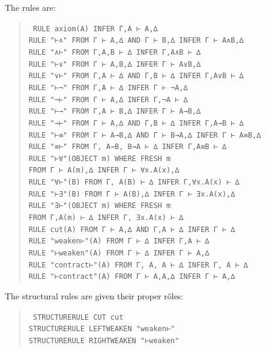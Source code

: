 The rules are:
\begin{quote}\tt\small
RULE    axiom(A)                                        INFER Γ,A ⊢ A,∆\\
RULE    "⊢∧"        FROM Γ ⊢ A,∆ AND Γ ⊢ B,∆    INFER Γ ⊢ A∧B,∆\\
RULE    "∧⊢"        FROM Γ,A,B ⊢ ∆                INFER Γ,A∧B ⊢ ∆\\
RULE    "⊢∨"        FROM Γ ⊢ A,B,∆                 INFER Γ ⊢ A∨B,∆\\
RULE    "∨⊢"        FROM Γ,A ⊢ ∆ AND Γ,B ⊢ ∆    INFER Γ,A∨B ⊢ ∆\\
RULE    "⊢¬"        FROM Γ,A ⊢ ∆                   INFER Γ ⊢ ¬A,∆\\
RULE    "¬⊢"        FROM Γ ⊢ A,∆                   INFER Γ,¬A ⊢ ∆\\
RULE    "⊢→"        FROM Γ,A ⊢ B,∆                 INFER Γ ⊢ A→B,∆\\
RULE    "→⊢"        FROM Γ ⊢ A,∆ AND Γ,B ⊢ ∆    INFER Γ,A→B ⊢ ∆\\
RULE    "⊢≡"        FROM Γ ⊢ A→B,∆ AND Γ ⊢ B→A,∆    INFER Γ ⊢ A≡B,∆\\
RULE    "≡⊢"        FROM Γ, A→B, B→A ⊢ ∆         INFER Γ,A≡B ⊢ ∆\\
RULE    "⊢∀"(OBJECT m) WHERE FRESH m\\
\tab                     FROM Γ ⊢ A(m),∆                INFER Γ ⊢ ∀x.A(x),∆\\
RULE    "∀⊢"(B)     FROM Γ, A(B) ⊢ ∆               INFER Γ,∀x.A(x) ⊢ ∆\\
RULE    "⊢∃"(B)     FROM Γ ⊢ A(B),∆                INFER Γ ⊢ ∃x.A(x),∆\\
RULE    "∃⊢"(OBJECT m) WHERE FRESH m\\
\tab                     FROM  Γ,A(m) ⊢ ∆               INFER Γ, ∃x.A(x) ⊢ ∆\\
RULE    cut(A)  FROM Γ ⊢ A,∆ AND Γ,A ⊢ ∆          INFER Γ ⊢ ∆\\
RULE    "weaken⊢"(A)    FROM Γ ⊢ ∆                  INFER Γ,A ⊢ ∆\\
RULE    "⊢weaken"(A)    FROM Γ ⊢ ∆                  INFER Γ ⊢ A,∆\\
RULE    "contract⊢"(A)  FROM Γ, A, A ⊢ ∆            INFER Γ, A ⊢ ∆\\
RULE    "⊢contract"(A)  FROM Γ ⊢ A,A,∆              INFER Γ ⊢ A,∆
\end{quote}

The structural rules are given their proper r\^{o}les:

\begin{quote}\tt\small
STRUCTURERULE CUT                   cut\\
STRUCTURERULE LEFTWEAKEN        "weaken⊢"\\
STRUCTURERULE RIGHTWEAKEN       "⊢weaken"
\end{quote}

